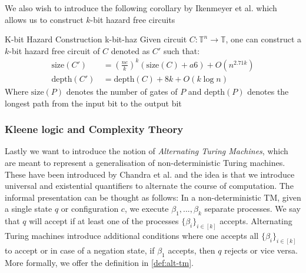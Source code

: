 We also wish to introduce the following corollary by
Ikenmeyer et al. \cite{ikenmeyer_ComplexityHazardfreeCircuits_2019} which allows us
to construct $k$-bit hazard free circuits

\begin{corollarybox}{K-bit Hazard Construction \cite{ikenmeyer_ComplexityHazardfreeCircuits_2019}}{k-bit-haz}
    Given circuit $C: \mathbb{T}^n \to \mathbb{T}$, one can construct a $k$-bit hazard free circuit of $C$ denoted as $C'$
    such that:
    \begin{align*}
        \text{size}(C')\quad & = (\frac{ne}{k})^k (\text{size}(C) + a6) + O(n^{2.71k}) \\
        \text{depth}(C')\, & = \text{depth}(C) + 8k + O(k \log n)
    \end{align*}
    Where $\text{size}(P)$ denotes the number of gates of $P$ and $\text{depth}(P)$ denotes the longest path from
    the input bit to the output bit
\end{corollarybox}


\subsubsection{Kleene logic and Complexity Theory}
Lastly we want to introduce the notion of \textit{Alternating Turing Machines}, which are meant to represent
a generalisation of non-deterministic Turing machines.
These have been introduced by Chandra et al. and the idea is that we introduce universal and existential quantifiers
to alternate the course of computation. The informal presentation can be thought as follows:
In a non-deterministic TM, given a single state $q$ or configuration $c$, we execute
$\beta_1, ..., \beta_k$ separate processes. We say that $q$ will accept if at least one of the processes
$\{\beta_i\}_{i \in [k]}$ accepts. Alternating Turing machines introduce additional conditions where
one accepts all $\{\beta_i\}_{i \in [k]}$ to accept or in case of a negation state, if $\beta_1$ accepts, then
$q$ rejects or vice versa. More formally, we offer the definition in \ref{def:alt-tm}.

